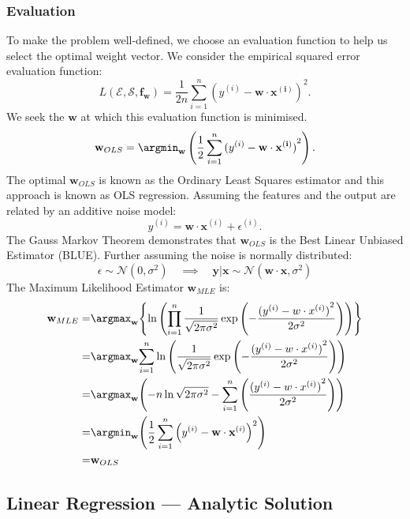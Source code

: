 \subsubsection{Evaluation}
To make the problem well-defined, we choose an evaluation function
to help us select the optimal weight vector. We consider the empirical squared
error evaluation function:
\[L(\mathcal{E},\mathcal{S},\mathbf{f_w})=\frac{1}{2n}\sum_{i=1}^{n} {(y^{(i)}-\mathbf{w\cdot x^{(i)}})}^{2}.\] 
We seek the $\mathbf{w}$ at which this evaluation function is minimised.
\[\mathbf{w}_{OLS}=\argmin_\mathbf{w}\left(\frac{1}{2}\sum_{i=1}^{n} {(y^{(i)}-\mathbf{w\cdot x^{(i)}})}^{2}\right).\] 
The optimal ${\mathbf{w}}_{OLS}$ is known as the Ordinary Least Squares
estimator and this approach is known as OLS regression.
Assuming the features and the output are related by an additive noise model:
\[y^{(i)}=\mathbf{w\cdot x}^{(i)}+\epsilon^{(i)}.\]
The Gauss Markov Theorem demonstrates that $\mathbf{w}_{OLS}$ is the Best
Linear Unbiased Estimator (BLUE).
Further assuming the noise is normally distributed:
\[\epsilon\sim\mathcal{N}(0,\sigma^{2})\quad \implies\quad
\mathbf{y|x}\sim\mathcal{N}(\mathbf{w\cdot x}, \sigma^{2})\] 
The Maximum Likelihood Estimator $\mathbf{w}_{MLE}$ is:
\begin{align*}
  \mathbf{w}_{MLE}=&\argmax_\mathbf{w}{\left\{\ln\left( \prod_{i=1}^{n} \frac{1}{\sqrt{2\pi\sigma^{2}}}\exp\left(-\frac{{(y^{(i)}-w\cdot x^{(i)})}^{2}}{2\sigma^{2}}\right)  \right)\right\} }\\
  =&\argmax_\mathbf{w}{\sum_{i=1}^{n} \ln\left( \frac{1}{\sqrt{2\pi\sigma^{2}}}\exp\left(-\frac{{(y^{(i)}-w\cdot x^{(i)})}^{2}}{2\sigma^{2}}\right)  \right) }\\
  =&\argmax_\mathbf{w}{\left(-n \ln \sqrt{2\pi\sigma^{2}} - \sum_{i=1}^{n} \left(\frac{{(y^{(i)}-w\cdot x^{(i)})}^{2}}{2\sigma^{2}}\right)  \right) }\\
  =&\argmin_\mathbf{w}{\left( \frac{1}{2}\sum_{i=1}^{n} {\left(y^{(i)}-\mathbf{w\cdot x}^{(i)}\right)}^{2} \right) }\\
  =&\mathbf{w}_{OLS}
\end{align*}

\subsection{Linear Regression --- Analytic Solution}
